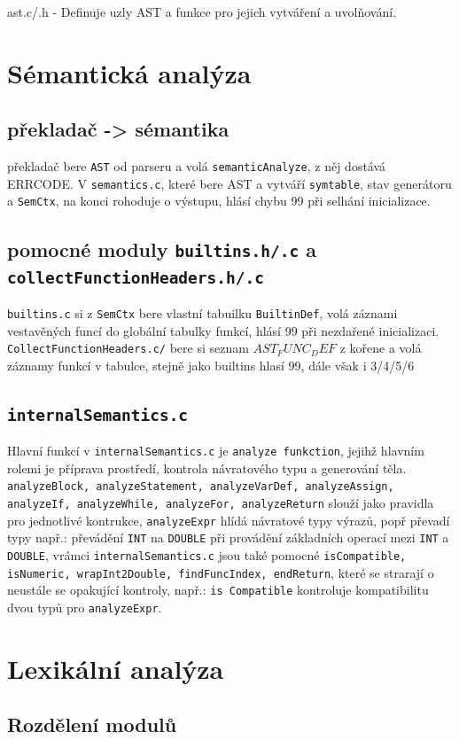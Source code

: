 \documentclass{article}
\begin{document}
ast.c/.h - Definuje uzly AST a funkce pro jejich vytváření a uvolňování.

\section{Sémantická analýza}
\subsection{překladač -> sémantika}
překladač bere \texttt{AST} od parseru a volá \texttt{semanticAnalyze}, z něj dostává ERRCODE. V \texttt{semantics.c}, které bere AST a vytváří \texttt{symtable}, stav generátoru a \texttt{SemCtx}, na konci rohoduje o výstupu, hlásí chybu 99 při selhání inicializace.
\subsection{pomocné moduly \texttt{builtins.h/.c} a \texttt{collectFunctionHeaders.h/.c}}
\texttt{builtins.c} si z \texttt{SemCtx} bere vlastní tabuilku \texttt{BuiltinDef}, volá záznami vestavěných funcí do globální tabulky funkcí, hlásí 99 při nezdařené inicializaci. \texttt{CollectFunctionHeaders.c/} bere si seznam \texttt{$AST_FUNC_DEF$} z kořene a volá záznamy funkcí v tabulce, stejně jako builtins hlasí 99, dále však i 3/4/5/6
\subsection{\texttt{internalSemantics.c}}
Hlavní funkcí v \texttt{internalSemantics.c} je \texttt{analyze funkction}, jejihž hlavním rolemi je příprava prostředí, kontrola návratového typu a generování těla. \texttt{analyzeBlock, analyzeStatement, analyzeVarDef, analyzeAssign, analyzeIf, analyzeWhile, analyzeFor, analyzeReturn} slouží jako pravidla pro jednotlivé kontrukce, \texttt{analyzeExpr} hlídá návratové typy výrazů, popř převadí typy např.: převádění \texttt{INT} na \texttt{DOUBLE} při provádění základních operací mezi \texttt{INT} a \texttt{DOUBLE}, vrámci \texttt{internalSemantics.c} jsou také pomocné \texttt{isCompatible, isNumeric, wrapInt2Double, findFuncIndex, endReturn}, které se strarají o neustále se opakující kontroly, např.: \texttt{is Compatible} kontroluje kompatibilitu dvou typů pro \texttt{analyzeExpr}.

\section{Lexikální analýza}
\subsection{Rozdělení modulů}
\end{document}
